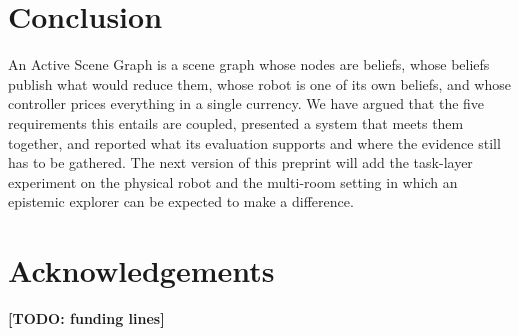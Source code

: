 \documentclass[10pt,twocolumn]{IEEEtran}
\newcommand{\todo}[1]{{\color{red}\textbf{[TODO: #1]}}}
\begin{document}
\section{Conclusion}

An Active Scene Graph is a scene graph whose nodes are beliefs, whose beliefs publish what would
reduce them, whose robot is one of its own beliefs, and whose controller prices everything in a
single currency. We have argued that the five requirements this entails are coupled, presented a
system that meets them together, and reported what its evaluation supports and where the evidence
still has to be gathered. The next version of this preprint will add the task-layer experiment on the
physical robot and the multi-room setting in which an epistemic explorer can be expected to make a
difference.

\section*{Acknowledgements}
\todo{funding lines}

\balance


\end{document}

